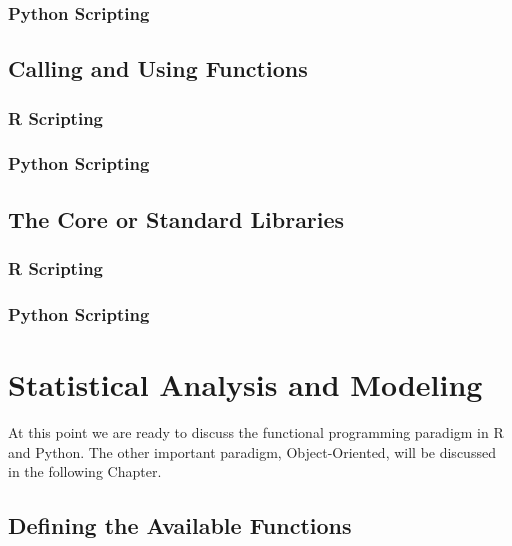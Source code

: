 \documentclass[]{book}
\theoremstyle{definition}
\theoremstyle{definition}
\theoremstyle{definition}
\theoremstyle{remark}
\begin{document}
\subsection{Python Scripting}\label{python-scripting-9}

\section{Calling and Using
Functions}\label{calling-and-using-functions-1}

\subsection{R Scripting}\label{r-scripting-10}

\subsection{Python Scripting}\label{python-scripting-10}

\section{The Core or Standard
Libraries}\label{the-core-or-standard-libraries}

\subsection{R Scripting}\label{r-scripting-11}

\subsection{Python Scripting}\label{python-scripting-11}

\chapter{Statistical Analysis and
Modeling}\label{statistical-analysis-and-modeling}

At this point we are ready to discuss the functional programming
paradigm in R and Python. The other important paradigm, Object-Oriented,
will be discussed in the following Chapter.

\section{Defining the Available
Functions}\label{defining-the-available-functions}
\end{document}
